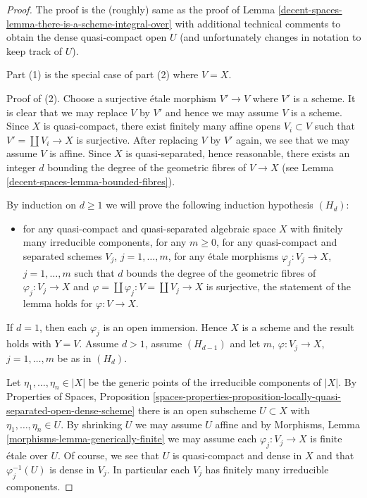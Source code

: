 \begin{proof}
The proof is the (roughly) same as the proof of
Lemma \ref{decent-spaces-lemma-there-is-a-scheme-integral-over}
with additional technical comments to obtain
the dense quasi-compact open $U$ (and unfortunately
changes in notation to keep track of $U$).

\medskip\noindent
Part (1) is the special case of part (2) where $V = X$.

\medskip\noindent
Proof of (2). Choose a surjective \'etale morphism $V' \to V$
where $V'$ is a scheme. It is clear that we may replace $V$ by $V'$
and hence we may assume $V$ is a scheme. Since $X$ is quasi-compact,
there exist finitely many affine opens $V_i \subset V$ such that
$V' = \coprod V_i \to X$ is surjective.
After replacing $V$ by $V'$ again, we see that we may assume $V$ is affine.
Since $X$ is quasi-separated, hence reasonable, there exists an integer
$d$ bounding the degree of the geometric fibres of $V \to X$
(see Lemma \ref{decent-spaces-lemma-bounded-fibres}).

\medskip\noindent
By induction on $d \geq 1$ we will prove the following induction
hypothesis $(H_d)$:
\begin{itemize}
\item for any quasi-compact and quasi-separated algebraic space
$X$ with finitely many irreducible components, for any $m \geq 0$,
for any quasi-compact and separated schemes $V_j$, $j = 1, \ldots, m$,
for any \'etale morphisms $\varphi_j : V_j \to X$, $j = 1, \ldots, m$
such that $d$ bounds the degree of the geometric fibres of
$\varphi_j : V_j\to X$ and
$\varphi = \coprod \varphi_j : V = \coprod V_j \to X$
is surjective, the statement of the lemma holds for $\varphi : V \to X$.
\end{itemize}
If $d = 1$, then each $\varphi_j$ is an open immersion. Hence $X$
is a scheme and the result holds with $Y = V$.
Assume $d > 1$, assume $(H_{d - 1})$ and let
$m$, $\varphi : V_j \to X$, $j = 1, \ldots, m$ be as in $(H_d)$.

\medskip\noindent
Let $\eta_1, \ldots, \eta_n \in |X|$ be the generic points of the
irreducible components of $|X|$. By
Properties of Spaces, Proposition
\ref{spaces-properties-proposition-locally-quasi-separated-open-dense-scheme}
there is an open subscheme $U \subset X$ with $\eta_1, \ldots, \eta_n \in U$.
By shrinking $U$ we may assume $U$ affine and by
Morphisms, Lemma \ref{morphisms-lemma-generically-finite}
we may assume each $\varphi_j : V_j \to X$ is finite \'etale over $U$.
Of course, we see that $U$ is quasi-compact and dense in $X$
and that $\varphi_j^{-1}(U)$ is dense in $V_j$. In particular each $V_j$
has finitely many irreducible components.


\end{proof}
